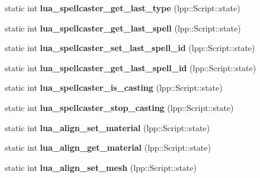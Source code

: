 \begin{DoxyCompactItemize}
\item 
static int {\bfseries lua\+\_\+spellcaster\+\_\+get\+\_\+last\+\_\+type} (lpp\+::\+Script\+::state)\hypertarget{class_lua_interface_ad9f9d9de4171abf88571bfff8ef90bca}{}\label{class_lua_interface_ad9f9d9de4171abf88571bfff8ef90bca}

\item 
static int {\bfseries lua\+\_\+spellcaster\+\_\+get\+\_\+last\+\_\+spell} (lpp\+::\+Script\+::state)\hypertarget{class_lua_interface_ad829cb92899ec4487d45ea39a2ff9044}{}\label{class_lua_interface_ad829cb92899ec4487d45ea39a2ff9044}

\item 
static int {\bfseries lua\+\_\+spellcaster\+\_\+set\+\_\+last\+\_\+spell\+\_\+id} (lpp\+::\+Script\+::state)\hypertarget{class_lua_interface_a7d92ebe99b5915d62864b7b2fc5c252b}{}\label{class_lua_interface_a7d92ebe99b5915d62864b7b2fc5c252b}

\item 
static int {\bfseries lua\+\_\+spellcaster\+\_\+get\+\_\+last\+\_\+spell\+\_\+id} (lpp\+::\+Script\+::state)\hypertarget{class_lua_interface_abddb6d892c29a04f9a50a20abda9caf8}{}\label{class_lua_interface_abddb6d892c29a04f9a50a20abda9caf8}

\item 
static int {\bfseries lua\+\_\+spellcaster\+\_\+is\+\_\+casting} (lpp\+::\+Script\+::state)\hypertarget{class_lua_interface_aec24cb6d682b1f8f48aedc6bc459376d}{}\label{class_lua_interface_aec24cb6d682b1f8f48aedc6bc459376d}

\item 
static int {\bfseries lua\+\_\+spellcaster\+\_\+stop\+\_\+casting} (lpp\+::\+Script\+::state)\hypertarget{class_lua_interface_a8a56254140b1bef1f5756384de47a5f3}{}\label{class_lua_interface_a8a56254140b1bef1f5756384de47a5f3}

\item 
static int {\bfseries lua\+\_\+align\+\_\+set\+\_\+material} (lpp\+::\+Script\+::state)\hypertarget{class_lua_interface_a21b3c10debc0fa319ed50d9d30ee10ed}{}\label{class_lua_interface_a21b3c10debc0fa319ed50d9d30ee10ed}

\item 
static int {\bfseries lua\+\_\+align\+\_\+get\+\_\+material} (lpp\+::\+Script\+::state)\hypertarget{class_lua_interface_a13ca13ff52b851237c278f97fc70dd65}{}\label{class_lua_interface_a13ca13ff52b851237c278f97fc70dd65}

\item 
static int {\bfseries lua\+\_\+align\+\_\+set\+\_\+mesh} (lpp\+::\+Script\+::state)\hypertarget{class_lua_interface_a2700617ac7a7654268626beba836f33c}{}\label{class_lua_interface_a2700617ac7a7654268626beba836f33c}


\end{DoxyCompactItemize}
